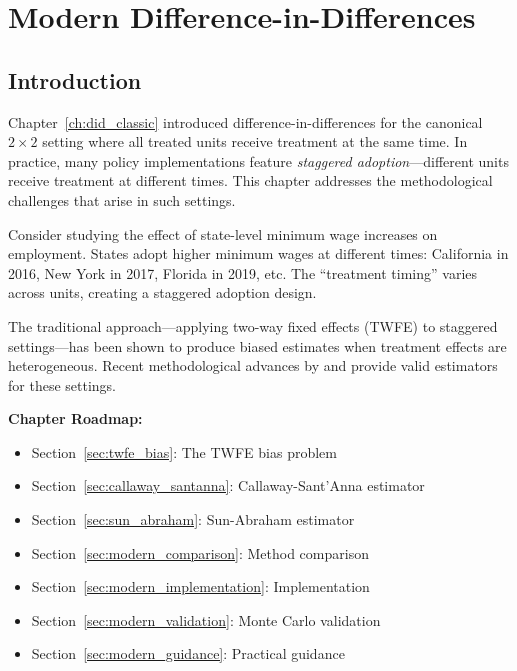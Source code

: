 
\chapter{Modern Difference-in-Differences}
\label{ch:did_modern}

\section{Introduction}
\label{sec:modern_did_intro}

Chapter~\ref{ch:did_classic} introduced difference-in-differences for the canonical $2 \times 2$ setting where all treated units receive treatment at the same time. In practice, many policy implementations feature \emph{staggered adoption}---different units receive treatment at different times. This chapter addresses the methodological challenges that arise in such settings.

\begin{example}
Consider studying the effect of state-level minimum wage increases on employment. States adopt higher minimum wages at different times: California in 2016, New York in 2017, Florida in 2019, etc. The ``treatment timing'' varies across units, creating a staggered adoption design.
\end{example}

The traditional approach---applying two-way fixed effects (TWFE) to staggered settings---has been shown to produce biased estimates when treatment effects are heterogeneous. Recent methodological advances by \citet{callaway2021difference} and \citet{sun2021estimating} provide valid estimators for these settings.

\textbf{Chapter Roadmap:}
\begin{itemize}
    \item Section~\ref{sec:twfe_bias}: The TWFE bias problem
    \item Section~\ref{sec:callaway_santanna}: Callaway-Sant'Anna estimator
    \item Section~\ref{sec:sun_abraham}: Sun-Abraham estimator
    \item Section~\ref{sec:modern_comparison}: Method comparison
    \item Section~\ref{sec:modern_implementation}: Implementation
    \item Section~\ref{sec:modern_validation}: Monte Carlo validation
    \item Section~\ref{sec:modern_guidance}: Practical guidance
\end{itemize}


